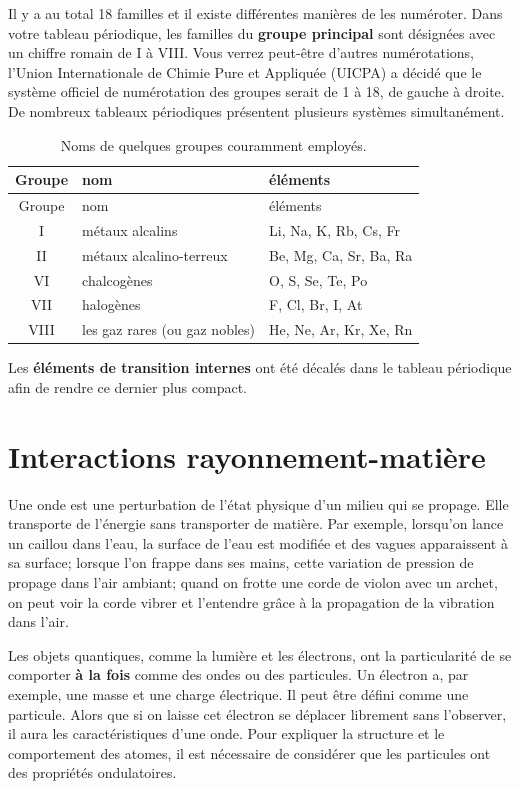 \documentclass[
  11pt,
  a4paper,
  openany]{book}
\begin{document}
Il y a au total 18 familles et il existe différentes manières de les numéroter. Dans votre tableau périodique, les familles du \textbf{groupe principal} sont désignées avec un chiffre romain de I à VIII. Vous verrez peut-être d'autres numérotations, l'Union Internationale de Chimie Pure et Appliquée (UICPA) a décidé que le système officiel de numérotation des groupes serait de 1 à 18, de gauche à droite. De nombreux tableaux périodiques présentent plusieurs systèmes simultanément.

\begin{longtable}[]{@{}cll@{}}
\caption{\label{tab:noms-groupes-courants} Noms de quelques groupes couramment employés.}\tabularnewline
\toprule\noalign{}
Groupe & nom & éléments \\
\midrule\noalign{}
\endfirsthead
\toprule\noalign{}
Groupe & nom & éléments \\
\midrule\noalign{}
\endhead
\bottomrule\noalign{}
\endlastfoot
I & métaux alcalins & Li, Na, K, Rb, Cs, Fr \\
II & métaux alcalino-terreux & Be, Mg, Ca, Sr, Ba, Ra \\
VI & chalcogènes & O, S, Se, Te, Po \\
VII & halogènes & F, Cl, Br, I, At \\
VIII & les gaz rares (ou gaz nobles) & He, Ne, Ar, Kr, Xe, Rn \\
\end{longtable}

Les \textbf{éléments de transition internes} ont été décalés dans le tableau périodique afin de rendre ce dernier plus compact.

\newpage

\section{Interactions rayonnement-matière}\label{interactions-rayonnement-matiuxe8re}

Une onde est une perturbation de l'état physique d'un milieu qui se propage. Elle transporte de l'énergie sans transporter de matière. Par exemple, lorsqu'on lance un caillou dans l'eau, la surface de l'eau est modifiée et des vagues apparaissent à sa surface; lorsque l'on frappe dans ses mains, cette variation de pression de propage dans l'air ambiant; quand on frotte une corde de violon avec un archet, on peut voir la corde vibrer et l'entendre grâce à la propagation de la vibration dans l'air.

Les objets quantiques, comme la lumière et les électrons, ont la particularité de se comporter \textbf{à la fois} comme des ondes ou des particules. Un électron a, par exemple, une masse et une charge électrique. Il peut être défini comme une particule. Alors que si on laisse cet électron se déplacer librement sans l'observer, il aura les caractéristiques d'une onde. Pour expliquer la structure et le comportement des atomes, il est nécessaire de considérer que les particules ont des propriétés ondulatoires.
\end{document}

